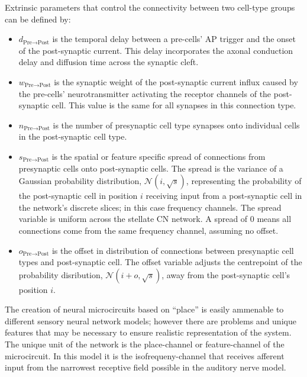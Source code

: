 
Extrinsic parameters that control the connectivity between two cell-type groups can be defined by:
\begin{itemize}
\item $d_{\textrm{{Pre}}\to\textrm{{Post}}}\xspace$ is the temporal delay  between a pre-cells' AP trigger and the onset of the post-synaptic current.
This  delay incorporates the axonal conduction delay and diffusion time across the  synaptic cleft.
\item $w_{\textrm{{Pre}}\to\textrm{{Post}}}\xspace$ is the synaptic weight of  the post-synaptic current influx caused by the pre-cells' neurotransmitter  activating the receptor channels of the post-synaptic cell.
  This value is the  same for all synapses in this connection type.
\item $n_{\textrm{{Pre}}\to\textrm{{Post}}}\xspace$ is the number of presynaptic cell type synapses onto individual cells in the post-synaptic cell type.
\item $s_{\textrm{{Pre}}\to\textrm{{Post}}}\xspace$ is the spatial or feature  specific spread of connections from presynaptic cells onto post-synaptic  cells.
  The spread is the variance of a Gaussian probability distribution,  $\mathcal{N}(i,\sqrt{s})$, representing the probability of the post-synaptic  cell in position $i$ receiving input from a post-synaptic cell in the  network's discrete slices; in this case frequency channels.
  The spread   variable is uniform across the stellate CN network.
  A spread of 0 means all  connections come from the same frequency channel, assuming no offset.
\item $o_{\textrm{{Pre}}\to\textrm{{Post}}}\xspace$ is the offset in  distribution of connections between presynaptic cell types and post-synaptic  cell.
  The offset variable adjusts the centrepoint of the probability  disribution, $\mathcal{N}(i + o, \sqrt{s})$, away from the post-synaptic  cell's position $i$.
\end{itemize}


The creation of neural microcircuits based on ``place'' is easily ammenable to different sensory neural network models; however there are problems and unique features that may be necessary to ensure realistic representation of the system.
The unique unit of the network is the place-channel or feature-channel of the microcircuit.
In this model it is the isofrequeny-channel that receives afferent input from the narrowest receptive field possible in the auditory nerve model.

